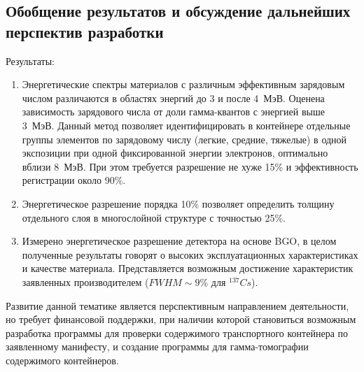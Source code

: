 \subsection{Обобщение результатов и обсуждение дальнейших перспектив разработки}
Результаты:   
\begin{enumerate}
    \item Энергетические спектры материалов с различным эффективным зарядовым числом различаются в областях энергий до 3 и после 4~МэВ. Оценена зависимость зарядового числа от доли гамма-квантов с энергией выше 3~МэВ. Данный метод позволяет идентифицировать в контейнере отдельные группы элементов по зарядовому числу (легкие, средние, тяжелые) в одной экспозиции при одной фиксированной энергии электронов, оптимально вблизи 8~МэВ. При этом требуется разрешение не хуже 15\% и эффективность регистрации около 90\%. 
    \item Энергетическое разрешение порядка 10\% позволяет определить толщину отдельного слоя в многослойной структуре с точностью 25\%.
    \item Измерено энергетическое разрешение детектора на основе BGO, в целом полученные результаты говорят о высоких эксплуатационных характеристиках и качестве материала. Представляется возможным достижение характеристик заявленных производителем ($FWHM \sim 9\%$ для $^{137}Cs$).
\end{enumerate}

Развитие данной тематике является перспективным направлением деятельности, но требует финансовой поддержки, при наличии которой становиться возможным разработка программы для проверки содержимого транспортного контейнера по заявленному манифесту, и создание программы для гамма-томографии содержимого контейнеров.

